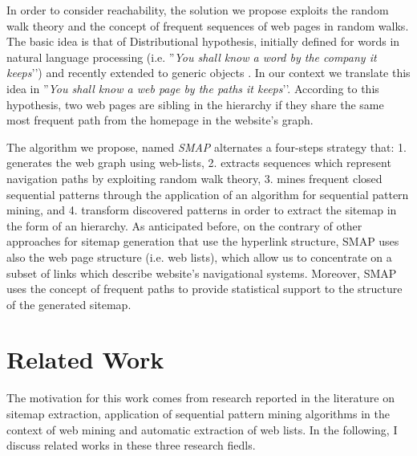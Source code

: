 In order to consider reachability, the solution we propose exploits the random walk theory and the concept of frequent sequences of web pages in random walks. The basic idea is that of Distributional hypothesis, initially defined for words in natural language processing (i.e. ''\textit{You shall know a word by the company it keeps}\rq\rq)%
\cite{Firth:1957} and recently extended to generic objects \cite{Gornerup:2015}. In our context we  translate this idea in ''\textit{You shall know a web page by the paths it keeps}\rq\rq. According to this hypothesis, two web pages are 
sibling in the hierarchy if they share the same most frequent path from the homepage in the website's graph.








The algorithm we propose, named \emph{SMAP} alternates a four-steps strategy that: 1. generates the web graph using web-lists, 2. extracts sequences which represent navigation paths by exploiting random walk theory, 3. mines frequent closed sequential patterns through the application of an algorithm for sequential pattern mining, and 4. transform discovered patterns in order to extract the sitemap in the form of an hierarchy. As anticipated before, on the contrary of other approaches for sitemap generation that use the  hyperlink structure, SMAP uses also the web page structure (i.e. web lists), which allow us to concentrate %
on a subset of links which describe website's navigational systems. Moreover, SMAP uses the concept of frequent paths to provide statistical support to the structure of the generated sitemap.


\section{Related Work}

The motivation for this work comes from research reported in the literature on sitemap extraction, application of sequential pattern mining algorithms in the context of web mining and automatic extraction of web lists. In the following, I discuss related works in these three research fiedls. 

